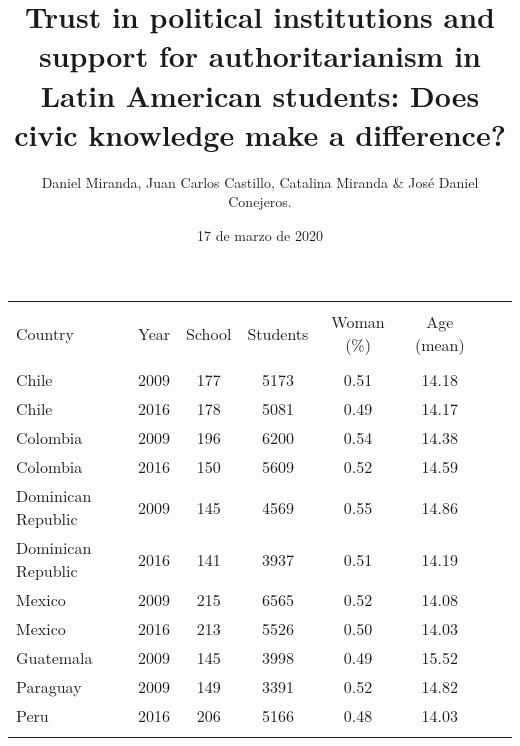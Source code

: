 \documentclass{article}
\title{Trust in political institutions and support for authoritarianism in Latin American students: Does civic knowledge make a difference?}
\author{Daniel Miranda, Juan Carlos Castillo, Catalina Miranda \& José Daniel Conejeros.}
\date{17 de marzo de 2020}
\begin{document}
\maketitle

\begin{table}[H] 
\centering 
  \label{table:1} 
\begin{tabular}{@{\extracolsep{3pt}}lccccccc} 
\\[-5ex]
\hline \\[-3ex] 
Country & \multicolumn{1}{c}{Year} & \multicolumn{1}{c}{School} & \multicolumn{1}{c}{Students} & \multicolumn{1}{c}{Woman (\%)} & \multicolumn{1}{c}{Age (mean)} \\ 
\hline \\[-3.0ex] 
Chile & 2009 & 177 & 5173 & 0.51 & 14.18 \\ 
  Chile & 2016 & 178 & 5081 & 0.49 & 14.17 \\ 
  Colombia & 2009 & 196 & 6200 & 0.54 & 14.38 \\ 
  Colombia & 2016 & 150 & 5609 & 0.52 & 14.59 \\ 
  Dominican Republic & 2009 & 145 & 4569 & 0.55 & 14.86 \\ 
  Dominican Republic & 2016 & 141 & 3937 & 0.51 & 14.19 \\ 
  Mexico & 2009 & 215 & 6565 & 0.52 & 14.08 \\ 
  Mexico & 2016 & 213 & 5526 & 0.50 & 14.03 \\ 
  Guatemala & 2009 & 145 & 3998 & 0.49 & 15.52 \\ 
  Paraguay & 2009 & 149 & 3391 & 0.52 & 14.82 \\ 
  Peru & 2016 & 206 & 5166 & 0.48 & 14.03 \\ 
\hline \\[-1.8ex] 
\end{tabular} 
\end{table} 

\break
\end{document}
